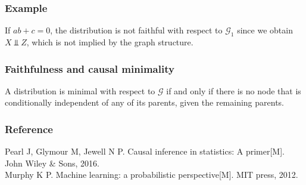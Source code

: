 \documentclass{beamer}
\begin{document}
\begin{frame}
    \frametitle{Example} 
    \begin{flushleft}
        If $ab+c=0$, the distribution is not faithful with respect to $\mathcal{G}_1$ since we obtain $X\Vbar Z$, which is
        not implied by the graph structure.
    \end{flushleft}
\end{frame}

\begin{frame}
    \frametitle{Faithfulness and causal minimality} 
    \begin{flushleft}
        A distribution is minimal with respect to $\mathcal{G}$ if and only if there is no node that is conditionally 
        independent of any of its parents, given the remaining parents.
    \end{flushleft}
\end{frame}

\begin{frame}
    \frametitle{Reference} 
    Pearl J, Glymour M, Jewell N P. Causal inference in statistics: A primer[M]. John Wiley \& Sons, 2016. \\
    Murphy K P. Machine learning: a probabilistic perspective[M]. MIT press, 2012. \\
\end{frame}
\end{document}

